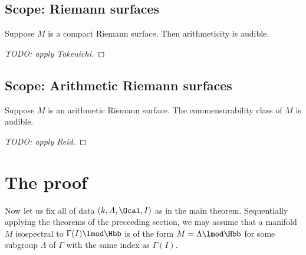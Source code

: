 \documentclass{amsart}
\begin{document}
	\subsection{Scope: Riemann surfaces}
	\begin{thm}
		Suppose $M$ is a compact Riemann surface. Then arithmeticity is audible.
	\end{thm}
	\begin{proof}
		[TODO: apply Takeuichi]
	\end{proof}
	\subsection{Scope: Arithmetic Riemann surfaces}
	\begin{thm}
		Suppose $M$ is an arithmetic Riemann surface. The commensurability class
		of $M$ is audible. \end{thm}
	\begin{proof}
		[TODO: apply Reid]
	\end{proof}
	\section{The proof}
	Now let us fix all of data $(k, A , \Ocal, I)$ as in the main theorem. Sequentially applying the
	theorems of the preceeding section, we may assume that a manifold $M$
	isospectral to $\Gamma(I) \lmod \Hbb$ is of the form $M = \Lambda \lmod \Hbb$
	for some subgroup $\Lambda$ of $\Gamma$ with the same index as  $\Gamma(I)$.
	
\end{document}
